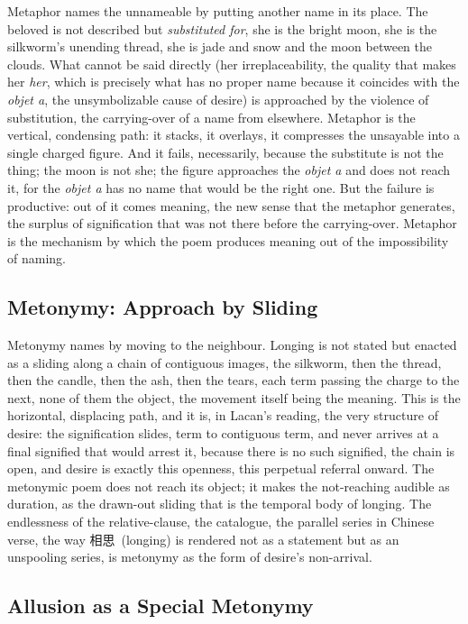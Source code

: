 Metaphor names the unnameable by putting another name in its place. The beloved is not described but \emph{substituted for}, she is the bright moon, she is the silkworm's unending thread, she is jade and snow and the moon between the clouds. What cannot be said directly (her irreplaceability, the quality that makes her \emph{her}, which is precisely what has no proper name because it coincides with the \textit{objet a}, the unsymbolizable cause of desire) is approached by the violence of substitution, the carrying-over of a name from elsewhere. Metaphor is the vertical, condensing path: it stacks, it overlays, it compresses the unsayable into a single charged figure. And it fails, necessarily, because the substitute is not the thing; the moon is not she; the figure approaches the \textit{objet a} and does not reach it, for the \textit{objet a} has no name that would be the right one. But the failure is productive: out of it comes meaning, the new sense that the metaphor generates, the surplus of signification that was not there before the carrying-over. Metaphor is the mechanism by which the poem produces meaning out of the impossibility of naming.

\subsection{Metonymy: Approach by Sliding}

Metonymy names by moving to the neighbour. Longing is not stated but enacted as a sliding along a chain of contiguous images, the silkworm, then the thread, then the candle, then the ash, then the tears, each term passing the charge to the next, none of them the object, the movement itself being the meaning. This is the horizontal, displacing path, and it is, in Lacan's reading, the very structure of desire: the signification slides, term to contiguous term, and never arrives at a final signified that would arrest it, because there is no such signified, the chain is open, and desire is exactly this openness, this perpetual referral onward. The metonymic poem does not reach its object; it makes the not-reaching audible as duration, as the drawn-out sliding that is the temporal body of longing. The endlessness of the relative-clause, the catalogue, the parallel series in Chinese verse, the way \cjkfont 相思\normalfont\ (longing) is rendered not as a statement but as an unspooling series, is metonymy as the form of desire's non-arrival.

\subsection{Allusion as a Special Metonymy}

